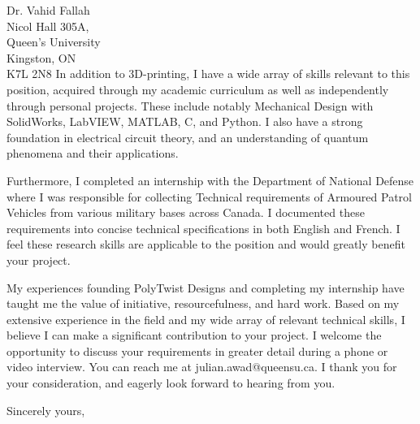 \documentclass[11pt]{letter} %
\begin{document}
\begin{letter}{Dr. Vahid Fallah \\
Nicol Hall 305A, \\
Queen's University \\
Kingston, ON \\
K7L 2N8}
In addition to 3D-printing, I have a wide array of skills relevant to this position, acquired through my academic curriculum as well as independently through personal projects. These include notably Mechanical Design with SolidWorks, LabVIEW, MATLAB, C, and Python. I also have a strong foundation in electrical circuit theory, and an understanding of quantum phenomena and their applications.

Furthermore, I completed an internship with the Department of National Defense where I was responsible for collecting Technical requirements of Armoured Patrol Vehicles from various military bases across Canada. I documented these requirements into concise technical specifications in both English and French. I feel these research skills are applicable to the position and would greatly benefit your project.

My experiences founding PolyTwist Designs and completing my internship have taught me the value of initiative, resourcefulness, and hard work. Based on my extensive experience in the field and my wide array of relevant technical skills, I believe I can make a significant contribution to your project. I welcome the opportunity to discuss your requirements in greater detail during a phone or video interview. You can reach me at julian.awad@queensu.ca. I thank you for your consideration, and eagerly look forward to hearing from you. 

\closing{Sincerely yours,}


\end{letter}
\end{document}
